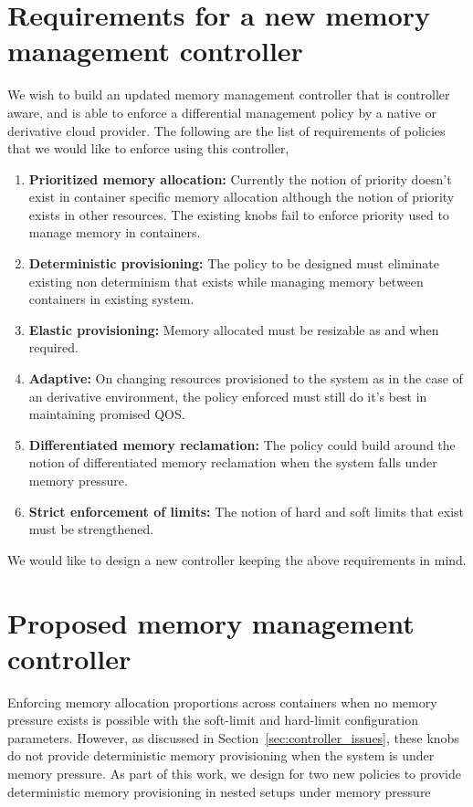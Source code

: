     
  \section{Requirements for a new memory management controller}
  
    We wish to build an updated memory management controller that is controller aware, and is able to enforce a differential management
    policy by a native or derivative cloud provider. The following are the list of requirements of policies that we would like to enforce
    using this controller,
  
    \begin{enumerate}
      \item \textbf{Prioritized memory allocation:} Currently the notion of priority doesn't exist in container specific memory allocation 
although the notion of priority exists in other resources. The existing knobs fail to enforce priority used to manage memory in containers. 
      \item \textbf{Deterministic provisioning:} The policy to be designed must eliminate existing non determinism that exists while 
managing memory between containers in existing system.
      \item \textbf{Elastic provisioning:} Memory allocated must be resizable as and when required. 
      \item \textbf{Adaptive:} On changing resources provisioned to the system as in the case of an derivative environment, the policy 
enforced must still do it's best in maintaining promised QOS.
      \item \textbf{Differentiated memory reclamation:} The policy could build around the notion of differentiated memory reclamation when 
the system falls under memory pressure.
      \item \textbf{Strict enforcement of limits:} The notion of hard and soft limits that exist must be strengthened.      
    \end{enumerate}
    
  We would like to design a new controller keeping the above requirements in mind.
   
  
  \section{Proposed memory management controller}
      
      Enforcing memory allocation proportions across containers when no memory pressure exists is possible with the soft-limit and hard-limit 
      configuration parameters. However, as discussed in Section~\ref{sec:controller_issues}, these knobs do not provide deterministic memory 
      provisioning when the system is under memory pressure. As part of this work, we design for two new policies to provide deterministic 
      memory provisioning in nested setups under memory pressure
      
